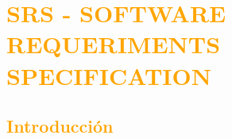 \chapter{\textcolor{orange}{SRS - SOFTWARE REQUERIMENTS SPECIFICATION}}
\newpage


\section{\textcolor{orange}{Introducción}}
